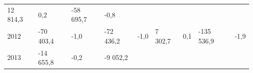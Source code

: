 \begin{longtable}[]{@{}lllllllll@{}}
\begin{minipage}[t]{0.12\columnwidth}
12 814,3\strut
\end{minipage} & \begin{minipage}[t]{0.06\columnwidth}\raggedright
0,2\strut
\end{minipage} & \begin{minipage}[t]{0.09\columnwidth}\raggedright
-58 695,7\strut
\end{minipage} & \begin{minipage}[t]{0.06\columnwidth}\raggedright
-0,8\strut
\end{minipage}\tabularnewline
\begin{minipage}[t]{0.05\columnwidth}\raggedright
2012\strut
\end{minipage} & \begin{minipage}[t]{0.10\columnwidth}\raggedright
-70 403,4\strut
\end{minipage} & \begin{minipage}[t]{0.06\columnwidth}\raggedright
-1,0\strut
\end{minipage} & \begin{minipage}[t]{0.16\columnwidth}\raggedright
-72 436,2\strut
\end{minipage} & \begin{minipage}[t]{0.06\columnwidth}\raggedright
-1,0\strut
\end{minipage} & \begin{minipage}[t]{0.12\columnwidth}\raggedright
7 302,7\strut
\end{minipage} & \begin{minipage}[t]{0.06\columnwidth}\raggedright
0,1\strut
\end{minipage} & \begin{minipage}[t]{0.09\columnwidth}\raggedright
-135 536,9\strut
\end{minipage} & \begin{minipage}[t]{0.06\columnwidth}\raggedright
-1,9\strut
\end{minipage}\tabularnewline
\begin{minipage}[t]{0.05\columnwidth}\raggedright
2013\strut
\end{minipage} & \begin{minipage}[t]{0.10\columnwidth}\raggedright
-14 655,8\strut
\end{minipage} & \begin{minipage}[t]{0.06\columnwidth}\raggedright
-0,2\strut
\end{minipage} & \begin{minipage}[t]{0.16\columnwidth}\raggedright
-9 052,2\strut

\end{minipage}
\end{longtable}
